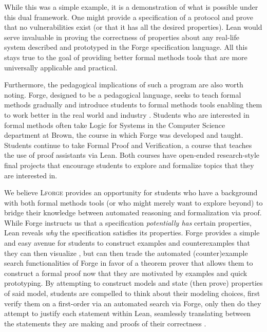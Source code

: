 While this was a simple example, it is a demonstration of what is possible under this dual framework. One might provide a specification of a protocol and prove that no vulnerabilities exist (or that it has all the desired properties). Lean would serve invaluable in proving the correctness of properties about any real-life system described and prototyped in the Forge specification language. All this stays true to the goal of providing better formal methods tools that are more universally applicable and practical. 

Furthermore, the pedagogical implications of such a program are also worth noting. Forge, designed to be a pedagogical language, seeks to teach formal methods gradually and introduce students to formal methods tools enabling them to work better in the real world and industry \cite{ngpdbccdlrrvwwk-oopsla-2024}. Students who are interested in formal methods often take Logic for Systems in the Computer Science department at Brown, the course in which Forge was developed and taught. Students continue to take Formal Proof and Verification, a course that teaches the use of proof assistants via Lean. Both courses have open-ended research-style final projects that encourage students to explore and formalize topics that they are interested in. 

We believe \textsc{Lforge} provides an opportunity for students who have a background with both formal methods tools (or who might merely want to explore beyond) to bridge their knowledge between automated reasoning and formalization via proof. While Forge instructs us that a specification \emph{potentially has} certain properties, Lean reveals \emph{why} the specification satisfies its properties. Forge provides a simple and easy avenue for students to construct examples and counterexamples that they can then visualize \cite{ngpdbccdlrrvwwk-oopsla-2024}, but can then trade the automated (counter)example search functionalities of Forge in favor of a theorem prover that allows them to construct a formal proof now that they are motivated by examples and quick prototyping. By attempting to construct models and state (then prove) properties of said model, students are compelled to think about their modeling choices, first verify them on a first-order via an automated search via Forge, only then do they attempt to justify each statement within Lean, seamlessly translating between the statements they are making and proofs of their correctness \cite{avigad2019learning}. 
